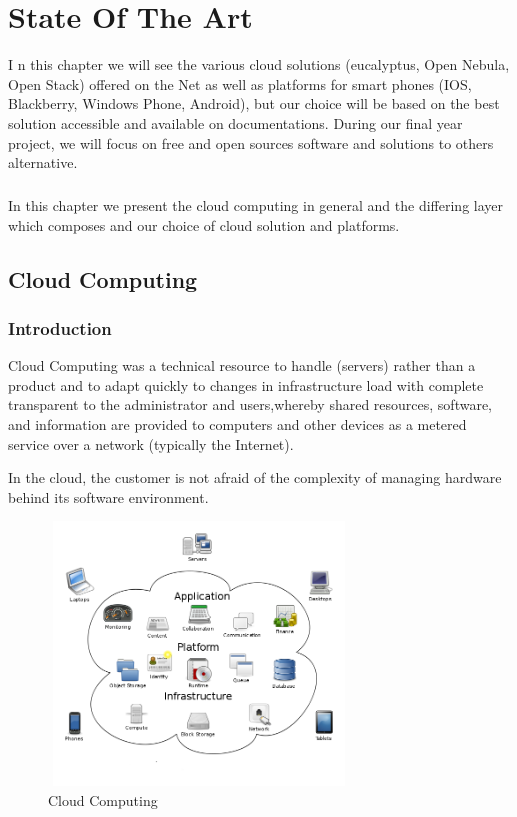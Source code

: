 \chapter{State Of The Art}
\lettrine[lines=3]{I}{} n this chapter we will see the various cloud solutions (eucalyptus, Open Nebula, Open Stack)
 offered on the Net as well as platforms for smart phones (IOS, Blackberry, Windows Phone, Android), 
but our choice will be based on the best solution accessible and available on documentations.
During our final year project, we will focus on free and open sources software and solutions to others alternative.
\paragraph{}In this chapter we present the cloud computing in general and the differing layer which composes and
our choice of cloud solution and platforms.\par

\newpage
\section{Cloud Computing}
\subsection{Introduction}
Cloud Computing  was a technical resource to handle (servers) rather than a product and to adapt quickly to changes in infrastructure load with complete
transparent to the administrator and users,whereby shared resources, software,
 and information are provided to computers and other devices as a metered service over a network (typically the Internet).

In the cloud, the customer is not afraid of the complexity of managing hardware behind its software environment.
\begin{figure}[!h]
 \center
 \includegraphics[width=8cm, height=7cm]{./images/Cloudcomputing.png}
 \caption{Cloud Computing}
\end{figure}



